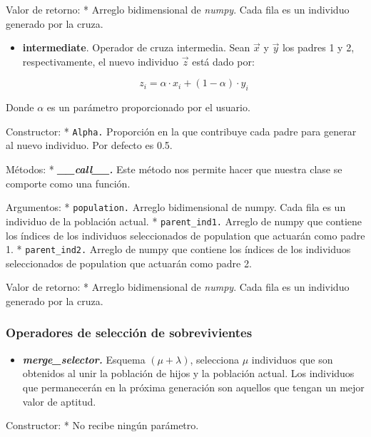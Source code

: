 \documentclass[11pt]{article}
\providecommand{\tightlist}{%
      \setlength{\itemsep}{0pt}\setlength{\parskip}{0pt}}
\begin{document}
Valor de retorno: * Arreglo bidimensional de \emph{numpy}. Cada fila es
un individuo generado por la cruza.

    \begin{itemize}
\tightlist
\item
  \textbf{intermediate}. Operador de cruza intermedia. Sean \(\vec{x}\)
  y \(\vec{y}\) los padres 1 y 2, respectivamente, el nuevo individuo
  \(\vec{z}\) está dado por:

  \begin{equation}
  z_{i} = \alpha \cdot x_{i} + (1 - \alpha) \cdot y_{i}
  \end{equation}
\end{itemize}

Donde \(\alpha\) es un parámetro proporcionado por el usuario.

Constructor: * \texttt{Alpha.} Proporción en la que contribuye cada
padre para generar al nuevo individuo. Por defecto es 0.5.

Métodos: * \emph{\textbf{\_\_call\_\_.}} Este método nos permite hacer
que nuestra clase se comporte como una función.

Argumentos: * \texttt{population.} Arreglo bidimensional de numpy. Cada
fila es un individuo de la población actual. * \texttt{parent\_ind1.}
Arreglo de numpy que contiene los índices de los individuos
seleccionados de population que actuarán como padre 1. *
\texttt{parent\_ind2.} Arreglo de numpy que contiene los índices de los
individuos seleccionados de population que actuarán como padre 2.

Valor de retorno: * Arreglo bidimensional de \emph{numpy}. Cada fila es
un individuo generado por la cruza.

    \subsubsection{Operadores de selección de
sobrevivientes}\label{operadores-de-selecciuxf3n-de-sobrevivientes}

    \begin{itemize}
\tightlist
\item
  \emph{\textbf{merge\_selector.}} Esquema \((\mu + \lambda)\),
  selecciona \(\mu\) individuos que son obtenidos al unir la población
  de hijos y la población actual. Los individuos que permanecerán en la
  próxima generación son aquellos que tengan un mejor valor de aptitud.
\end{itemize}

Constructor: * No recibe ningún parámetro.
\end{document}
